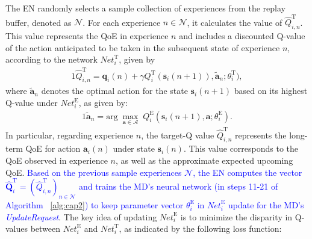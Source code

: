 \documentclass[12pt,draftclsnofoot,onecolumn]{IEEEtran}
\begin{document}
The EN randomly selects a sample collection of experiences from the replay buffer, denoted as $\mathcal{N}$. For each experience $n \in \mathcal{N}$, it calculates the value of $	\hat{Q}^{\text{T}}_{i,n}$. This value represents the QoE in experience $n$ and includes a discounted Q-value of the action anticipated to be taken in the subsequent state of experience $n$, according to the network $\textit{Net}^\text{T}_i$, given by
\begin{alignat}{1}
	\hat{Q}_{i,n}^{\text{T}} = \boldsymbol{q}_i(n) + \gamma Q_i^{\text{T}}(\boldsymbol{s}_i(n+1)), \tilde{\boldsymbol{a}}_n; \theta_i^{\text{T}}),
	\label{28}  
\end{alignat}  
where $\tilde{\boldsymbol{a}}_n$ denotes the optimal action for the state $\boldsymbol{s}_i(n+1)$ based on its highest Q-value under $\textit{Net}_i^{\text{E}}$, as given by:
\begin{alignat}{1}
	\tilde{\boldsymbol{a}}_n = \text{arg} \; \max_{\boldsymbol{a} \in \mathcal{A}} \; Q_i^{\text{E}}(\boldsymbol{s}_i(n+1), \boldsymbol{a}; \theta_i^{\text{E}}).
	\label{29}  
\end{alignat} 
In particular, regarding experience $n$, the target-Q value $\hat{Q}_{i,n}^{\text{T}}$ represents the long-term QoE for action $\boldsymbol{a}_i(n)$ under state $\boldsymbol{s}_i(n)$. This value corresponds to the QoE observed in experience $n$, as well as the approximate expected upcoming QoE. %
\textcolor{blue}{Based on the previous sample experiences $\mathcal{N}$, the EN computes the vector $\hat{\mathbf{Q}}_i^{\text{T}} = (\hat{Q}^{\text{T}}_{i,n})_{n \in \mathcal{N}}$ and trains the MD's neural network (in steps 11-21 of Algorithm ~\ref{alg:cap2}) to keep parameter vector $\theta^{\text{E}}_i$ in $\textit{Net}_i^{\text{E}}$ update for the MD's \textit{UpdateRequest}}. The key idea of updating $\textit{Net}_i^{\text{E}}$ is to minimize the disparity in Q-values between $\textit{Net}_i^{\text{E}}$ and $\textit{Net}_i^{\text{T}}$, as indicated by the following loss function:
\end{document}
